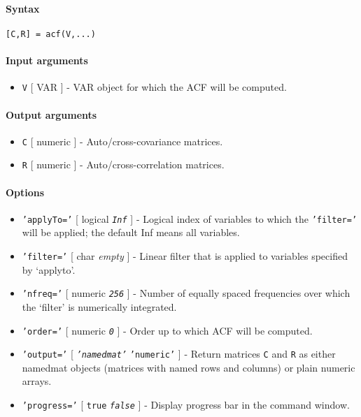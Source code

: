 


	\paragraph{Syntax}

\begin{verbatim}
[C,R] = acf(V,...)
\end{verbatim}

\paragraph{Input arguments}

\begin{itemize}
\itemsep1pt\parskip0pt
\item
  \texttt{V} {[} VAR {]} - VAR object for which the ACF will be
  computed.
\end{itemize}

\paragraph{Output arguments}

\begin{itemize}
\item
  \texttt{C} {[} numeric {]} - Auto/cross-covariance matrices.
\item
  \texttt{R} {[} numeric {]} - Auto/cross-correlation matrices.
\end{itemize}

\paragraph{Options}

\begin{itemize}
\item
  \texttt{'applyTo='} {[} logical \textbar{} \emph{\texttt{Inf}} {]} -
  Logical index of variables to which the \texttt{'filter='} will be
  applied; the default Inf means all variables.
\item
  \texttt{'filter='} {[} char \textbar{} \emph{empty} {]} - Linear
  filter that is applied to variables specified by `applyto'.
\item
  \texttt{'nfreq='} {[} numeric \textbar{} \emph{\texttt{256}} {]} -
  Number of equally spaced frequencies over which the `filter' is
  numerically integrated.
\item
  \texttt{'order='} {[} numeric \textbar{} \emph{\texttt{0}} {]} - Order
  up to which ACF will be computed.
\item
  \texttt{'output='} {[} \emph{\texttt{'namedmat'}} \textbar{}
  \texttt{'numeric'} {]} - Return matrices \texttt{C} and \texttt{R} as
  either namedmat objects (matrices with named rows and columns) or
  plain numeric arrays.
\item
  \texttt{'progress='} {[} \texttt{true} \textbar{}
  \emph{\texttt{false}} {]} - Display progress bar in the command
  window.
\end{itemize}

